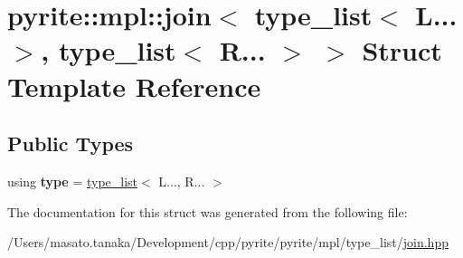 \hypertarget{structpyrite_1_1mpl_1_1join_3_01type__list_3_01_l_8_8_8_01_4_00_01type__list_3_01_r_8_8_8_01_4_01_4}{}\section{pyrite\+:\+:mpl\+:\+:join$<$ type\+\_\+list$<$ L... $>$, type\+\_\+list$<$ R... $>$ $>$ Struct Template Reference}
\label{structpyrite_1_1mpl_1_1join_3_01type__list_3_01_l_8_8_8_01_4_00_01type__list_3_01_r_8_8_8_01_4_01_4}
\subsection*{Public Types}
\begin{DoxyCompactItemize}
\item 
\mbox{\label{structpyrite_1_1mpl_1_1join_3_01type__list_3_01_l_8_8_8_01_4_00_01type__list_3_01_r_8_8_8_01_4_01_4_ac9e74c452c32febc687872c9e413cbe3}} 
using {\bfseries type} = \mbox{\hyperlink{structpyrite_1_1core_1_1mpl_1_1type__list}{type\+\_\+list}}$<$ L..., R... $>$
\end{DoxyCompactItemize}


The documentation for this struct was generated from the following file\+:\begin{DoxyCompactItemize}
\item 
/\+Users/masato.\+tanaka/\+Development/cpp/pyrite/pyrite/mpl/type\+\_\+list/\mbox{\hyperlink{join_8hpp}{join.\+hpp}}\end{DoxyCompactItemize}

